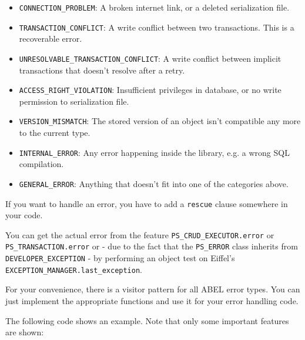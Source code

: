 \documentclass[a4paper,12pt]{report}
\begin{document}
\begin{itemize}
\item \lstinline!CONNECTION_PROBLEM!: A broken internet link, or a deleted serialization file.
\item \lstinline!TRANSACTION_CONFLICT!: A write conflict between two transactions. This is a recoverable error.
\item \lstinline!UNRESOLVABLE_TRANSACTION_CONFLICT!: A write conflict between implicit transactions that doesn't resolve after a retry.
\item \lstinline!ACCESS_RIGHT_VIOLATION!: Insufficient privileges in database, or no write permission to serialization file.
\item \lstinline!VERSION_MISMATCH!: The stored version of an object isn't compatible any more to the current type.
\item \lstinline!INTERNAL_ERROR!: Any error happening inside the library, e.g. a wrong SQL compilation.
\item \lstinline!GENERAL_ERROR!: Anything that doesn't fit into one of the categories above.
\end{itemize}

If you want to handle an error, you have to add a \lstinline{rescue} clause somewhere in your code.

You can get the actual error from the feature \lstinline!PS_CRUD_EXECUTOR.error! or \lstinline!PS_TRANSACTION.error! or - due to the fact that the \lstinline!PS_ERROR! class inherits from \lstinline!DEVELOPER_EXCEPTION! -
by performing an object test on Eiffel's \lstinline!EXCEPTION_MANAGER.last_exception!.

For your convenience, there is a visitor pattern for all ABEL error types. 
You can just implement the appropriate functions and use it for your error handling code.

The following code shows an example. 
Note that only some important features are shown:
\end{document}
